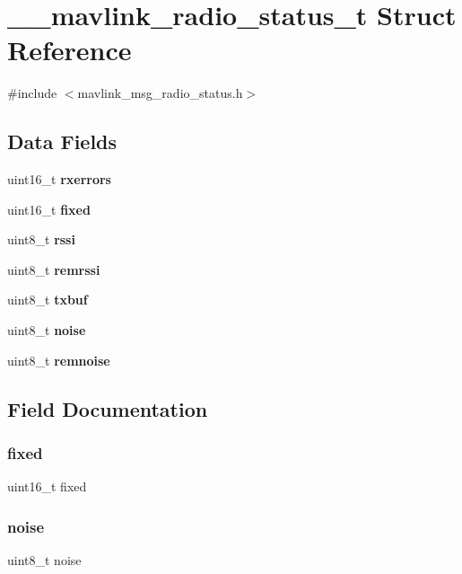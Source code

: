 \section{\+\_\+\+\_\+mavlink\+\_\+radio\+\_\+status\+\_\+t Struct Reference}
\label{struct____mavlink__radio__status__t}


{\ttfamily \#include $<$mavlink\+\_\+msg\+\_\+radio\+\_\+status.\+h$>$}

\subsection*{Data Fields}
\begin{DoxyCompactItemize}
\item 
uint16\+\_\+t \textbf{ rxerrors}
\item 
uint16\+\_\+t \textbf{ fixed}
\item 
uint8\+\_\+t \textbf{ rssi}
\item 
uint8\+\_\+t \textbf{ remrssi}
\item 
uint8\+\_\+t \textbf{ txbuf}
\item 
uint8\+\_\+t \textbf{ noise}
\item 
uint8\+\_\+t \textbf{ remnoise}
\end{DoxyCompactItemize}


\subsection{Field Documentation}
\mbox{\label{struct____mavlink__radio__status__t_ae85a62779e8501aa8e3e000540e93b11}} 
\subsubsection{fixed}
{\footnotesize\ttfamily uint16\+\_\+t fixed}

\mbox{\label{struct____mavlink__radio__status__t_a754a5ffa5dae1a54bd9c7a53fd5ccba0}} 
\subsubsection{noise}
{\footnotesize\ttfamily uint8\+\_\+t noise}

